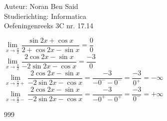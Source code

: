 \documentclass[a4paper]{article}
\begin{document}
\noindent \large Auteur: Noran Ben Said\\
\noindent \large Studierichting: Informatica\\
\noindent \large Oefeningenreeks 3C nr. 17.14 \\

\medskip
\normalsize

$\lim\limits_{x \to \tfrac{\pi}{2}} \dfrac{\sin 2x+\cos x}{2+\cos 2x-\sin x} = \dfrac{0}{0}$\\

$\lim\limits_{x \to\tfrac{\pi}{2}} \dfrac{2\cos 2x-\sin x}{-2\sin 2x-\cos x} = \dfrac{-3}{0}$\\

$\lim\limits_{x \to \tfrac{\pi}{2}+} \dfrac{2\cos 2x-\sin x}{-2\sin 2x-\cos x} = \dfrac{-3}{-0^{-}-0^{-}} = \dfrac{-3}{0^{+}} = -\infty$\\

$\lim\limits_{x \to \tfrac{\pi}{2}-} \dfrac{2\cos 2x-\sin x}{-2\sin 2x-\cos x} = \dfrac{-3}{-0^{+}-0^{+}} = \dfrac{-3}{0^{-}} = +\infty$\\



\begin{thebibliography}{999}
\end{thebibliography}
\end{document}
